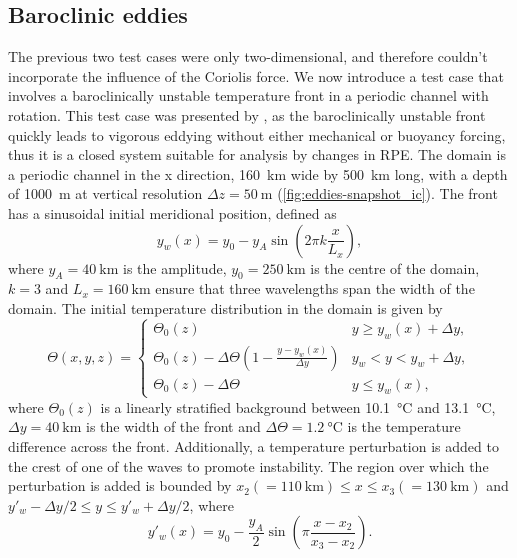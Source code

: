 \subsection{Baroclinic eddies}

The previous two test cases were only two-dimensional, and therefore couldn't incorporate the influence of the Coriolis force. We now introduce a test case that involves a baroclinically unstable temperature front in a periodic channel with rotation. This test case was presented by \citet{ilicak12}, as the baroclinically unstable front quickly leads to vigorous eddying without either mechanical or buoyancy forcing, thus it is a closed system suitable for analysis by changes in RPE. The domain is a periodic channel in the x direction, \SI{160}{\kilo\metre} wide by \SI{500}{\kilo\metre} long, with a depth of \SI{1000}{\metre} at vertical resolution $\Delta z = \SI{50}{\metre}$ (\cref{fig:eddies-snapshot_ic}). The front has a sinusoidal initial meridional position, defined as
%
\begin{equation}
  y_w(x) = y_0 - y_A \sin\left(2\pi k \frac{x}{L_x}\right),
\end{equation}
%
where $y_A = \SI{40}{\kilo\metre}$ is the amplitude, $y_0 = \SI{250}{\kilo\metre}$ is the centre of the domain, $k = 3$ and $L_x = \SI{160}{\kilo\metre}$ ensure that three wavelengths span the width of the domain. The initial temperature distribution in the domain is given by
%
\begin{equation}
  \Theta(x,y,z) = \begin{cases}
    \Theta_0(z) & y \ge y_w(x) + \Delta y, \\
    \Theta_0(z) - \Delta \Theta \left(1 - \frac{y - y_w(x)}{\Delta y}\right) & y_w < y < y_w + \Delta y, \\
    \Theta_0(z) - \Delta \Theta & y \le y_w(x),
  \end{cases}
\end{equation}
%
where $\Theta_0(z)$ is a linearly stratified background between \SI{10.1}{\celsius} and \SI{13.1}{\celsius}, $\Delta y = \SI{40}{\kilo\metre}$ is the width of the front and $\Delta \Theta = \SI{1.2}{\celsius}$ is the temperature difference across the front. Additionally, a temperature perturbation is added to the crest of one of the waves to promote instability. The region over which the perturbation is added is bounded by $x_2 (= \SI{110}{\kilo\metre}) \le x \le x_3 (= \SI{130}{\kilo\metre})$ and $y'_w - \Delta y / 2 \le y \le y'_w + \Delta y / 2$, where
%
\begin{equation}
  y'_w(x) = y_0 - \frac{y_A}{2}\sin\left(\pi \frac{x - x_2}{x_3 - x_2}\right).
\end{equation}

